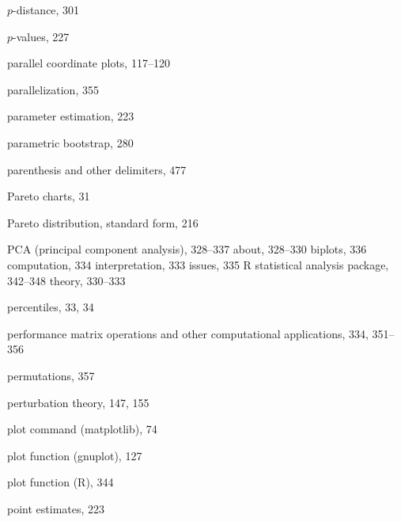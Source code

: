 \documentclass{Oreilly5980006}
\begin{document}
\begin{theindex}
\leaflong{3pt}
  \indexspace

  \item $p$-distance, 301
  \item $p$-values, 227
  \item parallel coordinate plots, 117--120
  \item parallelization, 355
  \item parameter estimation, 223
  \item parametric bootstrap, 280
  \item parenthesis and other delimiters, 477
  \item Pareto charts, 31
  \item Pareto distribution, standard form, 216
  \item PCA (principal component analysis), 328--337  
    \subitem about, 328--330
    \subitem biplots, 336
    \subitem computation, 334
    \subitem interpretation, 333
    \subitem issues, 335
    \subitem R statistical analysis package, 342--348
    \subitem theory, 330--333
  \item percentiles, 33, 34
  \item performance
    \subitem matrix operations and other computational applications, 
		334, 351--356
  \item permutations, 357
  \item perturbation theory, 147, 155
  \item plot command (matplotlib), 74
  \item plot function (gnuplot), 127
  \item plot function (R), 344
  \item point estimates, 223
 

\end{theindex}
\end{document}
